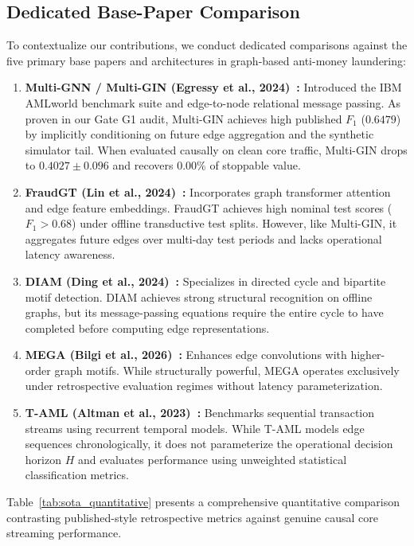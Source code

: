 \documentclass[pdflatex,sn-mathphys,Numbered]{sn-jnl}
\theoremstyle{thmstyleone}
\theoremstyle{thmstyletwo}
\theoremstyle{thmstylethree}
\begin{document}
\subsection{Dedicated Base-Paper Comparison}
To contextualize our contributions, we conduct dedicated comparisons against the five primary base papers and architectures in graph-based anti-money laundering:
\begin{enumerate}
    \item \textbf{Multi-GNN / Multi-GIN (Egressy et al., 2024)~\cite{egressy2024multigraph}:} Introduced the IBM AMLworld benchmark suite and edge-to-node relational message passing. As proven in our Gate G1 audit, Multi-GIN achieves high published $F_1$ ($0.6479$) by implicitly conditioning on future edge aggregation and the synthetic simulator tail. When evaluated causally on clean core traffic, Multi-GIN drops to $0.4027 \pm 0.096$ and recovers $0.00\%$ of stoppable value.
    \item \textbf{FraudGT (Lin et al., 2024)~\cite{lin2024fraudgt}:} Incorporates graph transformer attention and edge feature embeddings. FraudGT achieves high nominal test scores ($F_1 > 0.68$) under offline transductive test splits. However, like Multi-GIN, it aggregates future edges over multi-day test periods and lacks operational latency awareness.
    \item \textbf{DIAM (Ding et al., 2024)~\cite{ding2024diam}:} Specializes in directed cycle and bipartite motif detection. DIAM achieves strong structural recognition on offline graphs, but its message-passing equations require the entire cycle to have completed before computing edge representations.
    \item \textbf{MEGA (Bilgi et al., 2026)~\cite{bilgi2026mega}:} Enhances edge convolutions with higher-order graph motifs. While structurally powerful, MEGA operates exclusively under retrospective evaluation regimes without latency parameterization.
    \item \textbf{T-AML (Altman et al., 2023)~\cite{altman2023ibmaml}:} Benchmarks sequential transaction streams using recurrent temporal models. While T-AML models edge sequences chronologically, it does not parameterize the operational decision horizon $H$ and evaluates performance using unweighted statistical classification metrics.
\end{enumerate}

Table~\ref{tab:sota_quantitative} presents a comprehensive quantitative comparison contrasting published-style retrospective metrics against genuine causal core streaming performance.
\end{document}
